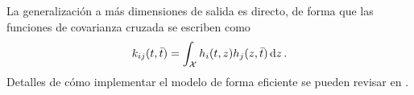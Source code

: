 La generalización a más dimensiones de salida es directo, de forma que las funciones de covarianza cruzada se escriben como
\[k_{ij}(t, \bar{t}) = \int_{\mathcal{X}} h_{i}(t, z) h_{j}(z, \bar{t}) \dd{z}.\]
Detalles de cómo implementar el modelo de forma eficiente se pueden revisar en \cite{alvarez2011computationally}\cite{alvarez2008sparse}.


